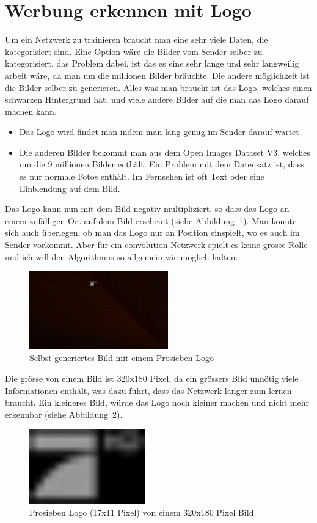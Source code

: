 \documentclass[12pt,a4paper]{report}
\begin{document}
\section{Werbung erkennen mit Logo}
Um ein Netzwerk zu trainieren braucht man eine sehr viele Daten, die kategorisiert sind.
Eine Option wäre die Bilder vom Sender selber zu kategorisiert, das Problem dabei, ist das es eine sehr lange und sehr langweilig arbeit wäre,
da man um die millionen Bilder bräuchte.
Die andere möglichkeit ist die Bilder selber zu generieren.
Alles was man braucht ist das Logo, welches einen schwarzen Hintergrund hat, und viele andere Bilder auf die man das Logo darauf machen kann.
\begin{itemize}
\item  Das Logo wird findet man indem man lang genug im Sender darauf wartet
\item Die anderen Bilder bekommt man aus dem Open Images Dataset V3\cite{openimages}, welches um die 9 millionen Bilder enthält.
Ein Problem mit dem Datensatz ist, dass es nur normale Fotos enthält.
Im Fernsehen ist oft Text oder eine Einblendung auf dem Bild.
\end{itemize}
Das Logo kann nun mit dem Bild negativ multipliziert, so dass das Logo an einem zufälligen Ort auf dem Bild erscheint (siehe Abbildung~\ref{fig:logo8}).
Man könnte sich auch überlegen, ob man das Logo nur an Position einspielt, wo es auch im Sender vorkommt.
Aber für ein convolution Netzwerk spielt es keine grosse Rolle und ich will den Algorithmus so allgemein wie möglich halten.
\begin{figure}[h]%
    \centering
    \includegraphics[width=6cm]{assets/images/logo_on_random_image.png}%
    \caption{Selbst generiertes Bild mit einem Prosieben Logo}%
    \label{fig:logo8}%
\end{figure}
Die grösse von einem Bild ist 320x180 Pixel, da ein grössers Bild unnötig viele Informationen enthält,
was dazu führt, dass das Netzwerk länger zum lernen braucht.
Ein kleineres Bild, würde das Logo noch kleiner machen und nicht mehr erkennbar (siehe Abbildung~\ref{fig:logo6}).
\begin{figure}[h]%
    \centering
    \includegraphics[width=5cm]{assets/images/logo17x11.png}%
    \caption{Prosieben Logo (17x11 Pixel) von einem 320x180 Pixel Bild}%
    \label{fig:logo6}%
\end{figure}
\end{document}
